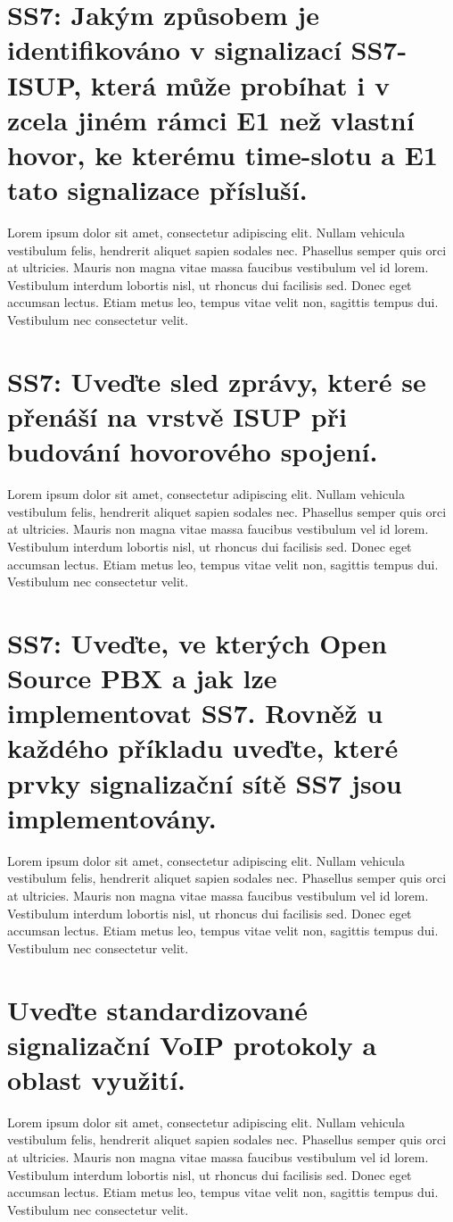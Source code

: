 \section{SS7: Jakým způsobem je identifikováno v signalizací SS7-ISUP, která může probíhat i v zcela jiném rámci E1 než vlastní hovor, ke kterému time-slotu a E1 tato signalizace přísluší.}
Lorem ipsum dolor sit amet, consectetur adipiscing elit. Nullam vehicula vestibulum felis, hendrerit aliquet sapien sodales nec. Phasellus semper quis orci at ultricies. Mauris non magna vitae massa faucibus vestibulum vel id lorem. Vestibulum interdum lobortis nisl, ut rhoncus dui facilisis sed. Donec eget accumsan lectus. Etiam metus leo, tempus vitae velit non, sagittis tempus dui. Vestibulum nec consectetur velit.

\section{SS7: Uveďte sled zprávy, které se přenáší na vrstvě ISUP při budování hovorového spojení.}
Lorem ipsum dolor sit amet, consectetur adipiscing elit. Nullam vehicula vestibulum felis, hendrerit aliquet sapien sodales nec. Phasellus semper quis orci at ultricies. Mauris non magna vitae massa faucibus vestibulum vel id lorem. Vestibulum interdum lobortis nisl, ut rhoncus dui facilisis sed. Donec eget accumsan lectus. Etiam metus leo, tempus vitae velit non, sagittis tempus dui. Vestibulum nec consectetur velit.

\section{SS7: Uveďte, ve kterých Open Source PBX a jak lze implementovat SS7. Rovněž u každého příkladu uveďte, které prvky signalizační sítě SS7 jsou implementovány.}
Lorem ipsum dolor sit amet, consectetur adipiscing elit. Nullam vehicula vestibulum felis, hendrerit aliquet sapien sodales nec. Phasellus semper quis orci at ultricies. Mauris non magna vitae massa faucibus vestibulum vel id lorem. Vestibulum interdum lobortis nisl, ut rhoncus dui facilisis sed. Donec eget accumsan lectus. Etiam metus leo, tempus vitae velit non, sagittis tempus dui. Vestibulum nec consectetur velit.

\section{Uveďte standardizované signalizační VoIP protokoly a oblast využití.}
Lorem ipsum dolor sit amet, consectetur adipiscing elit. Nullam vehicula vestibulum felis, hendrerit aliquet sapien sodales nec. Phasellus semper quis orci at ultricies. Mauris non magna vitae massa faucibus vestibulum vel id lorem. Vestibulum interdum lobortis nisl, ut rhoncus dui facilisis sed. Donec eget accumsan lectus. Etiam metus leo, tempus vitae velit non, sagittis tempus dui. Vestibulum nec consectetur velit.


